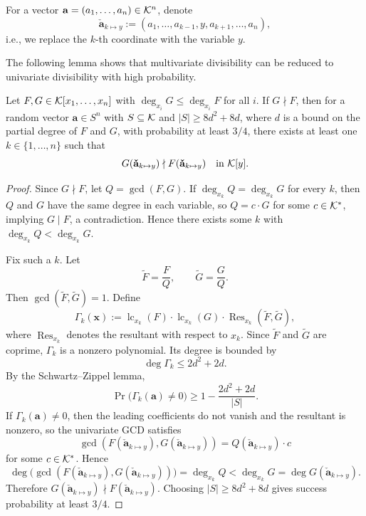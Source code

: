 \documentclass{article}
\numberwithin{equation}{section}
\begin{document}
For a vector $\mathbf{a} = (a_1,\dots,a_n) \in {\mathcal{K}}^n$, denote
\[
\mathbf{\check{a}}_{k \mapsto y}  := (a_1,\dots,a_{k-1}, y, a_{k+1},\dots,a_n),
\]
i.e., we replace the $k$-th coordinate with the variable $y$.

The following lemma shows that multivariate divisibility can be reduced to univariate divisibility with high probability.

\begin{lemma}\label{lem:divisibility-test}
Let $F, G \in {\mathcal{K}}[x_1,\dots,x_n]$ with $\deg_{x_i} G \le \deg_{x_i} F$ for all $i$. If $G \nmid F$, then for a random vector $\mathbf{a} \in S^n$ with $S \subseteq {\mathcal{K}}$ and $|S| \ge 8d^2 + 8d$, where $d$ is a bound on the partial degree of $F$ and $G$, with probability at least $3/4$, there exists at least one $k \in \{1,\dots,n\}$ such that
\[
G(\mathbf{\check{a}}_{k \mapsto y} ) \nmid F(\mathbf{\check{a}}_{k \mapsto y} ) \quad \text{in } {\mathcal{K}}[y].
\]
\end{lemma}

\begin{proof}
Since $G \nmid F$, let $Q = \gcd(F, G)$. If $\deg_{x_k} Q = \deg_{x_k} G$ for every $k$, then $Q$ and $G$ have the same degree in each variable, so $Q = c \cdot G$ for some $c \in {\mathcal{K}}^*$, implying $G \mid F$, a contradiction. Hence there exists some $k$ with $\deg_{x_k} Q < \deg_{x_k} G$.

Fix such a $k$. Let
\[
\tilde{F} = \frac{F}{Q}, \qquad \tilde{G} = \frac{G}{Q}.
\]
Then $\gcd(\tilde{F}, \tilde{G}) = 1$. Define
\[
\Gamma_k(\mathbf{x}) := \operatorname{lc}_{x_k}(F) \cdot \operatorname{lc}_{x_k}(G) \cdot \operatorname{Res}_{x_k}(\tilde{F}, \tilde{G}),
\]
where $\operatorname{Res}_{x_k}$ denotes the resultant with respect to $x_k$. Since $\tilde{F}$ and $\tilde{G}$ are coprime, $\Gamma_k$ is a nonzero polynomial. Its degree is bounded by
\[
\deg \Gamma_k \le 2d^2 + 2d.
\]
By the Schwartz--Zippel lemma,
\[
\Pr\bigl(\Gamma_k(\mathbf{a}) \neq 0\bigr) \ge 1 - \frac{2d^2 + 2d}{|S|}.
\]
If $\Gamma_k(\mathbf{a}) \neq 0$, then the leading coefficients do not vanish and the resultant is nonzero, so the univariate GCD satisfies
\[
\gcd(F(\mathbf{\check{a}}_{k \mapsto y} ), G(\mathbf{\check{a}}_{k \mapsto y} )) = Q(\mathbf{\check{a}}_{k \mapsto y} ) \cdot c
\]
for some $c \in {\mathcal{K}}^*$. Hence
\[
\deg\bigl(\gcd(F(\mathbf{\check{a}}_{k \mapsto y} ), G(\mathbf{\check{a}}_{k \mapsto y} ))\bigr)
= \deg_{x_k} Q
< \deg_{x_k} G
= \deg G(\mathbf{\check{a}}_{k \mapsto y} ).
\]
Therefore $G(\mathbf{\check{a}}_{k \mapsto y} ) \nmid F(\mathbf{\check{a}}_{k \mapsto y} )$. Choosing $|S| \ge 8d^2 + 8d$ gives success probability at least $3/4$.
\end{proof}
\end{document}
